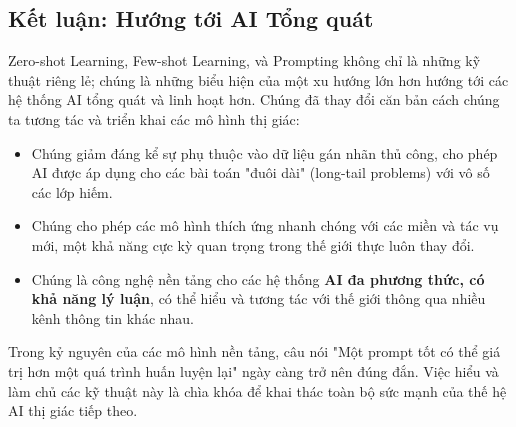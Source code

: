 \subsection{Kết luận: Hướng tới AI Tổng quát}
\label{subsec:zsl_fsl_conclusion}
Zero-shot Learning, Few-shot Learning, và Prompting không chỉ là những kỹ thuật riêng lẻ; chúng là những biểu hiện của một xu hướng lớn hơn hướng tới các hệ thống AI tổng quát và linh hoạt hơn. Chúng đã thay đổi căn bản cách chúng ta tương tác và triển khai các mô hình thị giác:
\begin{itemize}
	\item Chúng giảm đáng kể sự phụ thuộc vào dữ liệu gán nhãn thủ công, cho phép AI được áp dụng cho các bài toán "đuôi dài" (long-tail problems) với vô số các lớp hiếm.
	\item Chúng cho phép các mô hình thích ứng nhanh chóng với các miền và tác vụ mới, một khả năng cực kỳ quan trọng trong thế giới thực luôn thay đổi.
	\item Chúng là công nghệ nền tảng cho các hệ thống \textbf{AI đa phương thức, có khả năng lý luận}, có thể hiểu và tương tác với thế giới thông qua nhiều kênh thông tin khác nhau.
\end{itemize}
Trong kỷ nguyên của các mô hình nền tảng, câu nói "Một prompt tốt có thể giá trị hơn một quá trình huấn luyện lại" ngày càng trở nên đúng đắn. Việc hiểu và làm chủ các kỹ thuật này là chìa khóa để khai thác toàn bộ sức mạnh của thế hệ AI thị giác tiếp theo.

